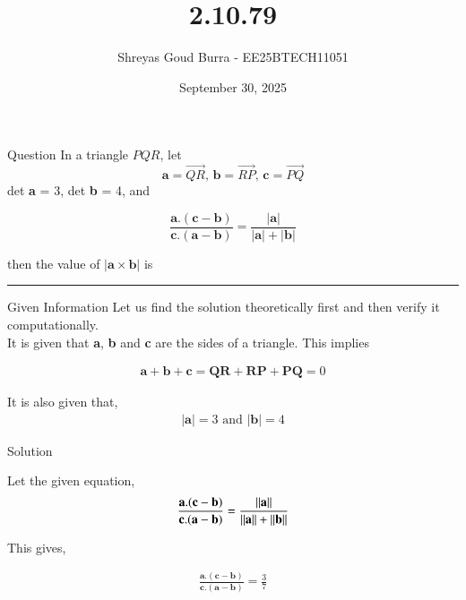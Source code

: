 \documentclass{beamer}
\title %
{2.10.79}
\date{September 30, 2025}
\author 
{Shreyas Goud Burra - EE25BTECH11051}
\begin{document}
\frame{\titlepage}

\begin{frame}{Question}
In a triangle $PQR$, let\\
$$\textbf{a}=\vec{QR},\, \textbf{b}=\vec{RP},\, \textbf{c}=\vec{PQ}$$
det \textbf{a} = 3,  det \textbf{b} = 4, and

$$\frac{\textbf{a}.(\textbf{c}-\textbf{b})}{\textbf{c}.(\textbf{a}-\textbf{b})}=\frac{\lvert \textbf{a}\rvert}{\lvert \textbf{a}\rvert+\lvert \textbf{b} \rvert}$$

then the value of $\lvert \textbf{a} \times \textbf{b} \rvert$ is \rule{1.5cm}{0.5mm}
\end{frame}

\begin{frame}{Given Information}
Let us find the solution theoretically first and then verify it computationally.\\
It is given that \textbf{a}, \textbf{b} and \textbf{c} are the sides of a triangle. This implies

\begin{align}
    \textbf{a}+\textbf{b}+\textbf{c} = \textbf{QR}+\textbf{RP}+\textbf{PQ} = 0
    \label{0.1}
\end{align}

It is also given that,
\begin{align}
    \lvert \textbf{a} \rvert=3\text{ and }\lvert \textbf{b} \rvert = 4
    \label{0.2}
\end{align}

\end{frame}
\begin{frame}{Solution}

Let the given equation,
\begin{align}
    \frac{\textbf{a}.(\textbf{c}-\textbf{b})}{\textbf{c}.(\textbf{a}-\textbf{b})}=\frac{\left\lVert\textbf{a}\right\rVert}{\left\lVert\textbf{a}\right\rVert+\left\lVert\textbf{b}\right\rVert}
    \label{0.3}
\end{align}

This gives,

\begin{align}
    \frac{\textbf{a}.(\textbf{c}-\textbf{b})}{\textbf{c}.(\textbf{a}-\textbf{b})}=\frac{3}{7}
    \label{0.4}
\end{align}

\end{frame}
\end{document}
